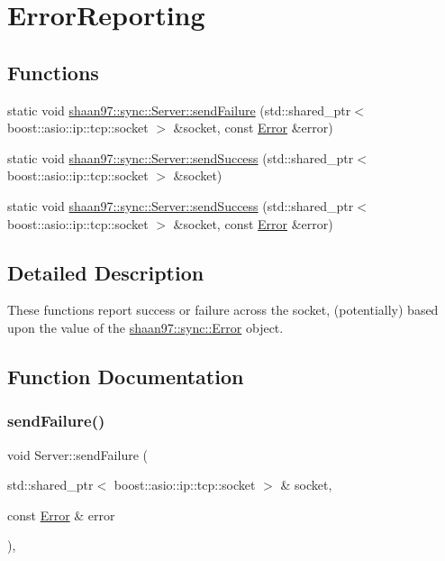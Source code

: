 \hypertarget{group___error_reporting}{}\section{Error\+Reporting}
\label{group___error_reporting}
\subsection*{Functions}
\begin{DoxyCompactItemize}
\item 
static void \hyperlink{group___error_reporting_ga360b9e55725804cfba4a86c040001342}{shaan97\+::sync\+::\+Server\+::send\+Failure} (std\+::shared\+\_\+ptr$<$ boost\+::asio\+::ip\+::tcp\+::socket $>$ \&socket, const \hyperlink{classshaan97_1_1sync_1_1_error}{Error} \&error)
\item 
static void \hyperlink{group___error_reporting_gaf606f6afc7f26d76733c7299599dd097}{shaan97\+::sync\+::\+Server\+::send\+Success} (std\+::shared\+\_\+ptr$<$ boost\+::asio\+::ip\+::tcp\+::socket $>$ \&socket)
\item 
static void \hyperlink{group___error_reporting_ga1b81d60d6c76ec6852c73f2749e6e2a4}{shaan97\+::sync\+::\+Server\+::send\+Success} (std\+::shared\+\_\+ptr$<$ boost\+::asio\+::ip\+::tcp\+::socket $>$ \&socket, const \hyperlink{classshaan97_1_1sync_1_1_error}{Error} \&error)
\end{DoxyCompactItemize}


\subsection{Detailed Description}
These functions report success or failure across the socket, (potentially) based upon the value of the {\ttfamily \hyperlink{classshaan97_1_1sync_1_1_error}{shaan97\+::sync\+::\+Error}} object. 

\subsection{Function Documentation}
\mbox{\label{group___error_reporting_ga360b9e55725804cfba4a86c040001342}} 
\subsubsection{\texorpdfstring{send\+Failure()}{sendFailure()}}
{\footnotesize\ttfamily void Server\+::send\+Failure (\begin{DoxyParamCaption}\item[{std\+::shared\+\_\+ptr$<$ boost\+::asio\+::ip\+::tcp\+::socket $>$ \&}]{socket,  }\item[{const \hyperlink{classshaan97_1_1sync_1_1_error}{Error} \&}]{error }\end{DoxyParamCaption})\hspace{0.3cm}{\ttfamily [static]}, {\ttfamily [private]}}

